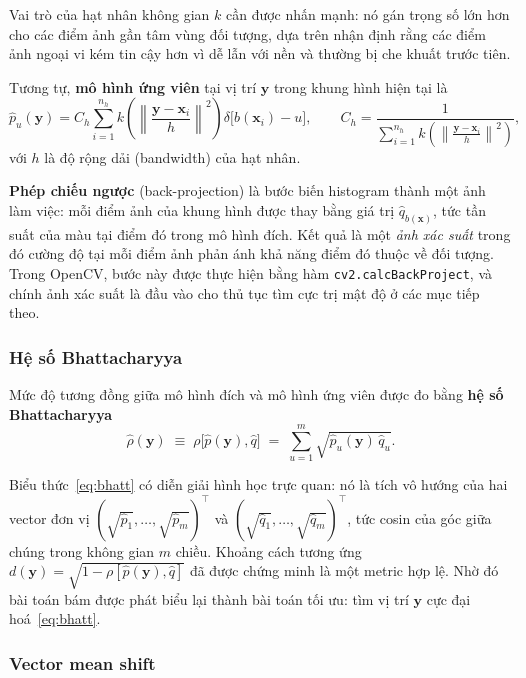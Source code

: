 \documentclass[12pt,a4paper]{article}
\numberwithin{equation}{section}
\begin{document}
Vai trò của hạt nhân không gian $k$ cần được nhấn mạnh: nó gán trọng số lớn hơn cho các điểm ảnh
gần tâm vùng đối tượng, dựa trên nhận định rằng các điểm ảnh ngoại vi kém tin cậy hơn vì dễ lẫn
với nền và thường bị che khuất trước tiên.

Tương tự, \textbf{mô hình ứng viên} tại vị trí $\mathbf{y}$ trong khung hình hiện tại là
\begin{equation}
\hat{p}_u(\mathbf{y}) = C_h \sum_{i=1}^{n_h}
k\!\left( \left\|\frac{\mathbf{y}-\mathbf{x}_i}{h}\right\|^{2}\right)
\delta\big[b(\mathbf{x}_i) - u\big],
\qquad C_h = \frac{1}{\sum_{i=1}^{n_h} k\!\left( \left\|\frac{\mathbf{y}-\mathbf{x}_i}{h}\right\|^{2}\right)},
\end{equation}
với $h$ là độ rộng dải (bandwidth) của hạt nhân.

\textbf{Phép chiếu ngược} (back-projection) là bước biến histogram thành một ảnh làm việc: mỗi
điểm ảnh của khung hình được thay bằng giá trị $\hat{q}_{b(\mathbf{x})}$, tức tần suất của màu tại
điểm đó trong mô hình đích. Kết quả là một \textit{ảnh xác suất} trong đó cường độ tại mỗi điểm
ảnh phản ánh khả năng điểm đó thuộc về đối tượng. Trong OpenCV, bước này được thực hiện bằng hàm
\texttt{cv2.calcBackProject}, và chính ảnh xác suất là đầu vào cho thủ tục tìm cực trị mật độ ở
các mục tiếp theo.

\subsubsection{Hệ số Bhattacharyya}

Mức độ tương đồng giữa mô hình đích và mô hình ứng viên được đo bằng \textbf{hệ số Bhattacharyya}
\begin{equation}
\hat{\rho}(\mathbf{y}) \;\equiv\; \rho\big[\hat{p}(\mathbf{y}), \hat{q}\big]
\;=\; \sum_{u=1}^{m} \sqrt{\hat{p}_u(\mathbf{y})\, \hat{q}_u}.
\label{eq:bhatt}
\end{equation}

Biểu thức~\eqref{eq:bhatt} có diễn giải hình học trực quan: nó là tích vô hướng của hai vector đơn
vị $(\sqrt{\hat p_1},\dots,\sqrt{\hat p_m})^\top$ và $(\sqrt{\hat q_1},\dots,\sqrt{\hat q_m})^\top$,
tức cosin của góc giữa chúng trong không gian $m$ chiều. Khoảng cách tương ứng
$d(\mathbf{y}) = \sqrt{1 - \rho[\hat{p}(\mathbf{y}), \hat{q}]}$ đã được chứng minh là một metric
hợp lệ. Nhờ đó bài toán bám được phát biểu lại thành bài toán tối ưu: tìm vị trí $\mathbf{y}$ cực
đại hoá~\eqref{eq:bhatt}.

\subsubsection{Vector mean shift}
\end{document}
